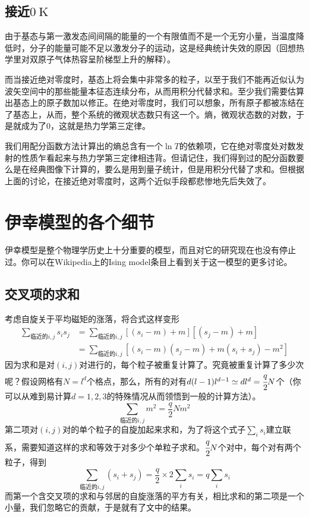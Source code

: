 \documentclass[a4paper,11pt]{ctexart}
\newcommand{\beq}{\begin{equation}}
\newcommand{\eeq}{\end{equation}}
\newcommand{\bea}{\begin{equation}\begin{aligned}}
\newcommand{\eea}{\end{aligned}\end{equation}}
\begin{document}
\subsection{接近$0\mathrm{\ K}$}
由于基态与第一激发态间间隔的能量的一个有限值而不是一个无穷小量，当温度降低时，分子的能量可能不足以激发分子的运动，这是经典统计失效的原因（回想热学里对双原子气体热容呈阶梯型上升的解释）。\par
而当接近绝对零度时，基态上将会集中非常多的粒子，以至于我们不能再近似认为波矢空间中的那些能量本征态连续分布，从而用积分代替求和。至少我们需要估算出基态上的原子数加以修正。在绝对零度时，我们可以想象，所有原子都被冻结在了基态上，从而，整个系统的微观状态数只有这一个。熵，微观状态数的对数，于是就成为了0，这就是热力学第三定律。\par
我们用配分函数方法计算出的熵总含有一个$\ln T$的依赖项，它在绝对零度处对数发射的性质乍看起来与热力学第三定律相违背。但请记住，我们得到过的配分函数要么是在经典图像下计算的，要么是用到量子统计，但是用积分代替了求和。但根据上面的讨论，在接近绝对零度时，这两个近似手段都悲惨地先后失效了。

\appendix
\section{伊幸模型的各个细节}
伊幸模型是整个物理学历史上十分重要的模型，而且对它的研究现在也没有停止过。你可以在Wikipedia上的Ising model条目上看到关于这一模型的更多讨论。
\subsection{交叉项的求和}
考虑自旋关于平均磁矩的涨落，将合式这样变形
\bea
\sum_{\text{临近的}i,j} s_i s_j &= \sum_{\text{临近的}i,j} [(s_i-m)+m][ (s_j-m)+m]\\
&= \sum_{\text{临近的}i,j}[(s_i-m)(s_j-m) +m(s_i+s_j) - m^2]
\eea
因为求和是对$(i,j)$对进行的，每个粒子被重复计算了。究竟被重复计算了多少次呢？假设网格有$N=l^d$个格点，那么，所有的对有$d(l-1)l^{d-1} \simeq dl^d=\cfrac{q}{2}N$个（你可以从难到易计算$d=1,2,3$的特殊情况从而领悟到一般的计算方法）。
\beq
\sum_{\text{临近的}i,j}m^2 =\frac{q}{2}Nm^2
\eeq
第二项对$(i,j)$对的单个粒子的自旋加起来求和，为了将这个式子$\sum_i s_i$建立联系，需要知道这样的求和等效于对多少个单粒子求和。$\cfrac{q}{2}N$个对中，每个对有两个粒子，得到
\beq
\sum_{\text{临近的}i,j} (s_i+s_j)= \frac{q}{2} \times 2 \sum_i s_i = q\sum_i s_i
\eeq
而第一个含交叉项的求和与邻居的自旋涨落的平方有关，相比求和的第二项是一个小量，我们忽略它的贡献，于是就有了文中的结果。
\end{document}
